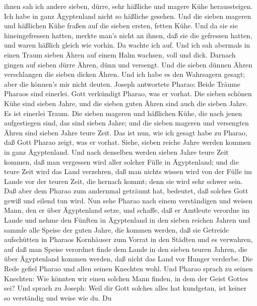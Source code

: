 ihnen sah ich andere sieben, dürre, sehr häßliche und magere Kühe
heraussteigen. Ich habe in ganz Ägyptenland nicht so häßliche gesehen.
 Und die sieben mageren und häßlichen Kühe fraßen auf die
sieben ersten, fetten Kühe.  Und da sie sie hineingefressen
hatten, merkte man's nicht an ihnen, daß sie die gefressen hatten, und
waren häßlich gleich wie vorhin. Da wachte ich auf.  Und
ich sah abermals in einen Traum sieben Ähren auf einem Halm wachsen,
voll und dick.  Darnach gingen auf sieben dürre Ähren, dünn
und versengt.  Und die sieben dünnen Ähren verschlangen die
sieben dicken Ähren. Und ich habe es den Wahrsagern gesagt; aber die
können's mir nicht deuten.  Joseph antwortete Pharao: Beide
Träume Pharaos sind einerlei. Gott verkündigt Pharao, was er vorhat.
 Die sieben schönen Kühe sind sieben Jahre, und die sieben
guten Ähren sind auch die sieben Jahre. Es ist einerlei Traum.
 Die sieben mageren und häßlichen Kühe, die nach jenen
aufgestiegen sind, das sind sieben Jahre; und die sieben mageren und
versengten Ähren sind sieben Jahre teure Zeit.  Das ist
nun, wie ich gesagt habe zu Pharao, daß Gott Pharao zeigt, was er
vorhat.  Siehe, sieben reiche Jahre werden kommen in ganz
Ägyptenland.  Und nach denselben werden sieben Jahre teure
Zeit kommen, daß man vergessen wird aller solcher Fülle in Ägyptenland;
und die teure Zeit wird das Land verzehren,  daß man nichts
wissen wird von der Fülle im Lande vor der teuren Zeit, die hernach
kommt; denn sie wird sehr schwer sein.  Daß aber dem Pharao
zum andernmal geträumt hat, bedeutet, daß solches Gott gewiß und eilend
tun wird.  Nun sehe Pharao nach einem verständigen und
weisen Mann, den er über Ägyptenland setze,  und schaffe,
daß er Amtleute verordne im Lande und nehme den Fünften in Ägyptenland
in den sieben reichen Jahren  und sammle alle Speise der
guten Jahre, die kommen werden, daß sie Getreide aufschütten in Pharaos
Kornhäuser zum Vorrat in den Städten und es verwahren,  auf
daß man Speise verordnet finde dem Lande in den sieben teuren Jahren,
die über Ägyptenland kommen werden, daß nicht das Land vor Hunger
verderbe.  Die Rede gefiel Pharao und allen seinen Knechten
wohl.  Und Pharao sprach zu seinen Knechten: Wie könnten
wir einen solchen Mann finden, in dem der Geist Gottes sei?
 Und sprach zu Joseph: Weil dir Gott solches alles hat
kundgetan, ist keiner so verständig und weise wie du.  Du
